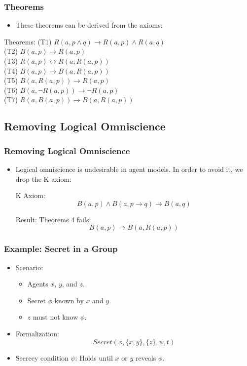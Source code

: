 \documentclass[aspectratio=169]{beamer}
\begin{document}
\begin{frame}
\frametitle{Theorems}
\begin{itemize}
    \item These theorems can be derived from the axioms:
\end{itemize}
\begin{block}{Theorems:}
    \Large
    \normalfont
    (T1) $R(a, p \wedge q) \rightarrow R(a, p) \wedge R(a, q)$ \\
    (T2) $B(a, p) \rightarrow R(a, p)$ \\
    (T3) $R(a, p) \leftrightarrow R(a, R(a, p))$ \\
    (T4) $B(a, p) \rightarrow B(a, R(a, p))$ \\
    (T5) $B(a, R(a, p)) \rightarrow R(a, p)$ \\
    (T6) $B(a, \neg R(a, p)) \rightarrow \neg R(a, p)$ \\
    (T7) $R(a, B(a, p)) \rightarrow B(a, R(a, p))$
\end{block}
\end{frame}

\subsection{Removing Logical Omniscience}
\begin{frame}
\frametitle{Removing Logical Omniscience}
\Large 
\begin{itemize}
    \item Logical omniscience is undesirable in agent models. In order to avoid it, we drop the K axiom:
    \begin{block}{K Axiom:}
    \[
    B(a, p) \wedge B(a, p \rightarrow q) \rightarrow B(a, q)
    \]
    \end{block}
    \begin{block}{Result:}
        Theorems 4 fails: 
        \[
        B(a, p) \rightarrow B(a, R(a, p))
        \]
    \end{block}
\end{itemize}
\end{frame}


\begin{frame}
\frametitle{Example: Secret in a Group}
\begin{itemize}
    \Large
    \item Scenario:
    \begin{itemize}
        \Large
        \item Agents $x$, $y$, and $z$.
        \item Secret $\phi$ known by $x$ and $y$.
        \item $z$ must not know $\phi$.
    \end{itemize}
    \item Formalization:
    \[
    Secret(\phi, \{x,y\}, \{z\}, \psi, t)
    \]
    \item Secrecy condition $\psi$: Holds until $x$ or $y$ reveals $\phi$.
\end{itemize}
\end{frame}
\end{document}
